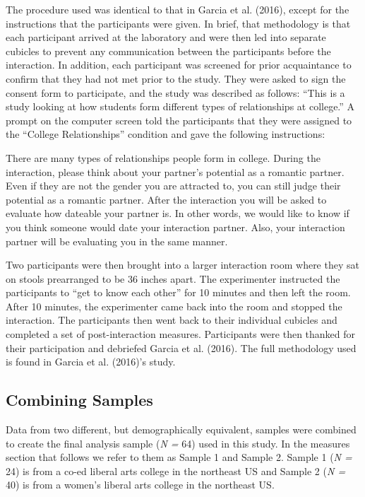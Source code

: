 \documentclass[man]{apa6}
\begin{document}
The procedure used was identical to that in Garcia et al. (2016), except
for the instructions that the participants were given. In brief, that
methodology is that each participant arrived at the laboratory and were
then led into separate cubicles to prevent any communication between the
participants before the interaction. In addition, each participant was
screened for prior acquaintance to confirm that they had not met prior
to the study. They were asked to sign the consent form to participate,
and the study was described as follows: \enquote{This is a study looking
at how students form different types of relationships at college.} A
prompt on the computer screen told the participants that they were
assigned to the \enquote{College Relationships} condition and gave the
following instructions:

There are many types of relationships people form in college. During the
interaction, please think about your partner's potential as a romantic
partner. Even if they are not the gender you are attracted to, you can
still judge their potential as a romantic partner. After the interaction
you will be asked to evaluate how dateable your partner is. In other
words, we would like to know if you think someone would date your
interaction partner. Also, your interaction partner will be evaluating
you in the same manner.

Two participants were then brought into a larger interaction room where
they sat on stools prearranged to be 36 inches apart. The experimenter
instructed the participants to \enquote{get to know each other} for 10
minutes and then left the room. After 10 minutes, the experimenter came
back into the room and stopped the interaction. The participants then
went back to their individual cubicles and completed a set of
post-interaction measures. Participants were then thanked for their
participation and debriefed Garcia et al. (2016). The full methodology
used is found in Garcia et al. (2016)'s study.

\subsection{Combining Samples}\label{combining-samples}

Data from two different, but demographically equivalent, samples were
combined to create the final analysis sample (\emph{N =} 64) used in
this study. In the measures section that follows we refer to them as
Sample 1 and Sample 2. Sample 1 (\emph{N =} 24) is from a co-ed liberal
arts college in the northeast US and Sample 2 (\emph{N =} 40) is from a
women's liberal arts college in the northeast US.
\end{document}

